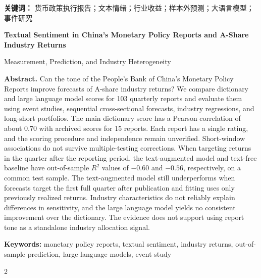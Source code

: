 \documentclass[UTF8,zihao=-4,fontset=fandol,a4paper]{ctexart}
\begin{document}
\noindent\textbf{关键词：} 货币政策执行报告；文本情绪；行业收益；样本外预测；大语言模型；事件研究

\vspace{0.9em}
\begin{center}
  {\large\bfseries Textual Sentiment in China's Monetary Policy Reports and A-Share Industry Returns}\par
  \vspace{0.2em}
  {\normalsize Measurement, Prediction, and Industry Heterogeneity}
\end{center}
\noindent\textbf{Abstract.}
Can the tone of the People's Bank of China's Monetary Policy Reports improve forecasts of A-share industry returns? We compare dictionary and large language model scores for 103 quarterly reports and evaluate them using event studies, sequential cross-sectional forecasts, industry regressions, and long-short portfolios. The main dictionary score has a Pearson correlation of about 0.70 with archived scores for 15 reports. Each report has a single rating, and the scoring procedure and independence remain unverified. Short-window associations do not survive multiple-testing corrections. When targeting returns in the quarter after the reporting period, the text-augmented model and text-free baseline have out-of-sample $R^2$ values of $-0.60$ and $-0.56$, respectively, on a common test sample. The text-augmented model still underperforms when forecasts target the first full quarter after publication and fitting uses only previously realized returns. Industry characteristics do not reliably explain differences in sensitivity, and the large language model yields no consistent improvement over the dictionary. The evidence does not support using report tone as a standalone industry allocation signal.

\noindent\textbf{Keywords:} monetary policy reports, textual sentiment, industry returns, out-of-sample prediction, large language models, event study

\clearpage
\tableofcontents
\vspace{1em}
\begingroup
\small
\setlength{\columnsep}{1.7em}
\begin{multicols}{2}
  \listoffigures
  \listoftables
\end{multicols}
\endgroup
\clearpage
{}




\FloatBarrier

\FloatBarrier
\clearpage
\begingroup
\renewcommand*{\bibfont}{\small}
\printbibliography[heading=bibintoc,title={参考文献}]
\endgroup
\clearpage

\end{document}
